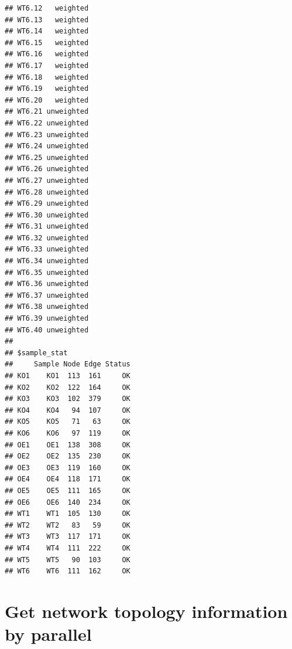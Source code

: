 \documentclass[
]{book}
\begin{document}
\begin{verbatim}
## WT6.12   weighted
## WT6.13   weighted
## WT6.14   weighted
## WT6.15   weighted
## WT6.16   weighted
## WT6.17   weighted
## WT6.18   weighted
## WT6.19   weighted
## WT6.20   weighted
## WT6.21 unweighted
## WT6.22 unweighted
## WT6.23 unweighted
## WT6.24 unweighted
## WT6.25 unweighted
## WT6.26 unweighted
## WT6.27 unweighted
## WT6.28 unweighted
## WT6.29 unweighted
## WT6.30 unweighted
## WT6.31 unweighted
## WT6.32 unweighted
## WT6.33 unweighted
## WT6.34 unweighted
## WT6.35 unweighted
## WT6.36 unweighted
## WT6.37 unweighted
## WT6.38 unweighted
## WT6.39 unweighted
## WT6.40 unweighted
## 
## $sample_stat
##     Sample Node Edge Status
## KO1    KO1  113  161     OK
## KO2    KO2  122  164     OK
## KO3    KO3  102  379     OK
## KO4    KO4   94  107     OK
## KO5    KO5   71   63     OK
## KO6    KO6   97  119     OK
## OE1    OE1  138  308     OK
## OE2    OE2  135  230     OK
## OE3    OE3  119  160     OK
## OE4    OE4  118  171     OK
## OE5    OE5  111  165     OK
## OE6    OE6  140  234     OK
## WT1    WT1  105  130     OK
## WT2    WT2   83   59     OK
## WT3    WT3  117  171     OK
## WT4    WT4  111  222     OK
## WT5    WT5   90  103     OK
## WT6    WT6  111  162     OK
\end{verbatim}

\section{Get network topology information by parallel}\label{get-network-topology-information-by-parallel}
\end{document}
